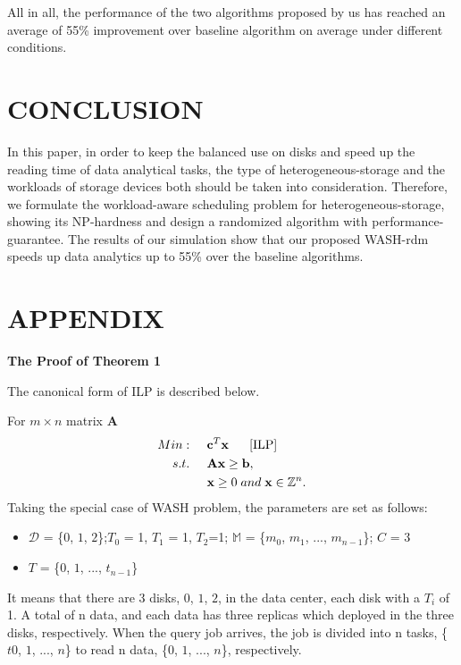 \documentclass[conference]{IEEEtran}
\begin{document}
 All in all,  the performance of the two algorithms proposed by us has reached an average of 55\% improvement over baseline algorithm on average under different conditions.



\section{CONCLUSION}\label{CONCLUSION}
In this paper, in order to keep the balanced use on disks and speed up the reading time of data analytical tasks, the type of heterogeneous-storage and the workloads of storage devices both should be taken into consideration. Therefore, we formulate the workload-aware scheduling problem for heterogeneous-storage, showing its NP-hardness and design a randomized algorithm with performance-guarantee. The results of our simulation show that our proposed WASH-rdm speeds up data analytics up to 55\% over the baseline algorithms.

\section*{APPENDIX}

\textbf{\normalsize{The Proof of Theorem 1}}
\vspace{1ex}

The canonical form \cite{b11} of ILP is described below.

For $m\times n$ matrix \textbf{A}
\begin{align}
Min:&\;\;\;\;\;\textbf{c}^T\textbf{x}\;\;\;\;\;\;[\rm{ILP}]\label{ILP}\\
s.t. 
&\;\;\;\;\;\textbf{A}\textbf{x}\geq \textbf{b},\nonumber\\
&\;\;\;\;\;\textbf{x} \geq0\;and\;\textbf{x} \in \mathbb{Z}^n.\nonumber
\end{align}
Taking the special case of WASH problem, the parameters are set as follows:
\begin{itemize}
	\item $\mathcal{D}$ = \{$0$, $1$, $2$\};$T_0$ = 1, $T_1$ = 1, $T_2$=1; $\mathbb{M}$ = \{$m_0$, $m_1$, ..., $m_{n-1}$\}; $C$ = 3
	\item $T$ = \{$0$, $1$, ..., $t_{n-1}$\}
\end{itemize}

It means that there are 3 disks, $0$, $1$, $2$, in the data center, each disk with a $T_i$ of 1. A total of n data, and each data has three replicas which deployed in the three disks, respectively. When the query job arrives, the job is divided into n tasks, \{$t0$, $1$, ..., $n$\} to read n data, \{$0$, $1$, ..., $n$\}, respectively.
\end{document}
